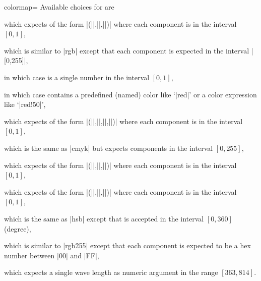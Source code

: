 \begin{pgfplotskey}{colormap=}
    Available choices for  are
    \begin{description}
        \item {} which expects  of the
            form |(||,||,||)| where each
            component is in the interval $[0,1]$,
        \item {} which is similar to |rgb| except that
            each component is expected in the interval |[0,255]|,
        \item {} in which case  is a
            single number in the interval $[0,1]$,
        \item {} in which case  contains
            a predefined (named) color like `|red|' or a color expression
            like `|red!50|',
        \item {} which expects  of the
            form
            |(||,||,||,||)|
            where each component is in the interval $[0,1]$,
        \item {} which is the same as |cmyk| but
            expects components in the interval $[0,255]$,
        \item {} which expects  of the
            form |(||,||,||)| where
            each component is in the interval $[0,1]$,
        \item {} which expects  of the
            form |(||,||,||)|
            where each component is in the interval $[0,1]$,
        \item {} which is the same as |hsb| except that
             is accepted in the interval $[0,360]$ (degree),
        \item {} which is similar to |rgb255| except that
            each component is expected to be a hex number between |00| and
            |FF|,
        \item {} which expects a single wave length as
            numeric argument in the range $[363,814]$.
    \end{description}


\end{pgfplotskey}
